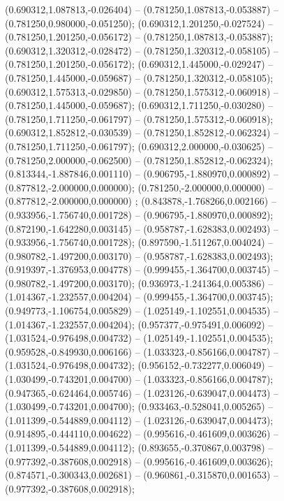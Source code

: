  (0.690312,1.087813,-0.026404) -- (0.781250,1.087813,-0.053887) -- (0.781250,0.980000,-0.051250);
 (0.690312,1.201250,-0.027524) -- (0.781250,1.201250,-0.056172) -- (0.781250,1.087813,-0.053887);
 (0.690312,1.320312,-0.028472) -- (0.781250,1.320312,-0.058105) -- (0.781250,1.201250,-0.056172);
 (0.690312,1.445000,-0.029247) -- (0.781250,1.445000,-0.059687) -- (0.781250,1.320312,-0.058105);
 (0.690312,1.575313,-0.029850) -- (0.781250,1.575312,-0.060918) -- (0.781250,1.445000,-0.059687);
 (0.690312,1.711250,-0.030280) -- (0.781250,1.711250,-0.061797) -- (0.781250,1.575312,-0.060918);
 (0.690312,1.852812,-0.030539) -- (0.781250,1.852812,-0.062324) -- (0.781250,1.711250,-0.061797);
 (0.690312,2.000000,-0.030625) -- (0.781250,2.000000,-0.062500) -- (0.781250,1.852812,-0.062324);
 (0.813344,-1.887846,0.001110) -- (0.906795,-1.880970,0.000892) -- (0.877812,-2.000000,0.000000);
 (0.781250,-2.000000,0.000000) -- (0.877812,-2.000000,0.000000) ;
 (0.843878,-1.768266,0.002166) -- (0.933956,-1.756740,0.001728) -- (0.906795,-1.880970,0.000892);
 (0.872190,-1.642280,0.003145) -- (0.958787,-1.628383,0.002493) -- (0.933956,-1.756740,0.001728);
 (0.897590,-1.511267,0.004024) -- (0.980782,-1.497200,0.003170) -- (0.958787,-1.628383,0.002493);
 (0.919397,-1.376953,0.004778) -- (0.999455,-1.364700,0.003745) -- (0.980782,-1.497200,0.003170);
 (0.936973,-1.241364,0.005386) -- (1.014367,-1.232557,0.004204) -- (0.999455,-1.364700,0.003745);
 (0.949773,-1.106754,0.005829) -- (1.025149,-1.102551,0.004535) -- (1.014367,-1.232557,0.004204);
 (0.957377,-0.975491,0.006092) -- (1.031524,-0.976498,0.004732) -- (1.025149,-1.102551,0.004535);
 (0.959528,-0.849930,0.006166) -- (1.033323,-0.856166,0.004787) -- (1.031524,-0.976498,0.004732);
 (0.956152,-0.732277,0.006049) -- (1.030499,-0.743201,0.004700) -- (1.033323,-0.856166,0.004787);
 (0.947365,-0.624464,0.005746) -- (1.023126,-0.639047,0.004473) -- (1.030499,-0.743201,0.004700);
 (0.933463,-0.528041,0.005265) -- (1.011399,-0.544889,0.004112) -- (1.023126,-0.639047,0.004473);
 (0.914895,-0.444110,0.004622) -- (0.995616,-0.461609,0.003626) -- (1.011399,-0.544889,0.004112);
 (0.893655,-0.370867,0.003798) -- (0.977392,-0.387608,0.002918) -- (0.995616,-0.461609,0.003626);
 (0.874571,-0.300343,0.002681) -- (0.960861,-0.315870,0.001653) -- (0.977392,-0.387608,0.002918);
